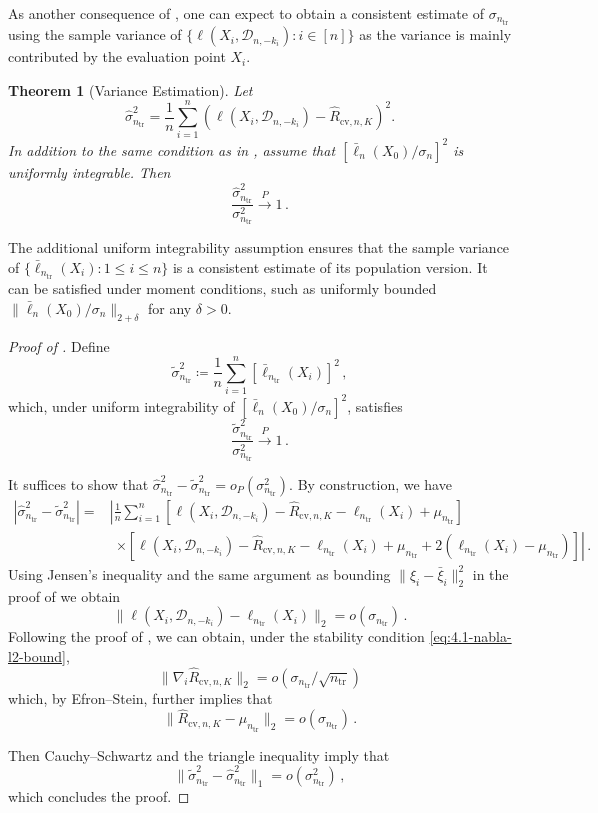 \documentclass[11pt]{article}
\theoremstyle{plain}
\newtheorem{theorem}{Theorem}[section]
\newcommand{\cv}{{\mathrm{cv}}}
\newcommand{\tr}{{\mathrm{tr}}}
\newcommand{\D}{{\mathcal{D}}}
\begin{document}
As another consequence of , one can expect to obtain a consistent estimate of $\sigma_{n_\tr}$ using the sample variance of $\{\ell(X_i,\D_{n,-k_i}):i\in[n]\}$ as the variance is mainly contributed by the evaluation point $X_i$.
\begin{theorem}[Variance Estimation]\label{thm:4.1-var-est}
    Let 
    $$\hat\sigma_{n_\tr}^2=\frac{1}{n}\sum_{i=1}^n\left(\ell(X_i,\D_{n,-k_i})-\hat R_{\cv,n,K}\right)^2.$$
In addition to the same condition as in , assume that
 $[\bar\ell_n(X_0)/\sigma_n]^2$ is uniformly integrable.
Then 
    $$
    \frac{\hat\sigma_{n_\tr}^2}{\sigma_{n_\tr}^2}\stackrel{P}{\rightarrow} 1\,.
    $$
\end{theorem}
The additional uniform integrability assumption ensures that the sample variance of $\{\bar\ell_{n_\tr}(X_i):1\le i\le n\}$ is a consistent estimate of its population version. It can be satisfied under moment conditions, such as uniformly bounded $\|\bar\ell_n(X_0)/\sigma_n\|_{2+\delta}$ for any $\delta>0$.
\begin{proof}
    [Proof of ]
    
    Define 
    $$\tilde\sigma_{n_\tr}^2\coloneqq \frac{1}{n}\sum_{i=1}^n [\bar\ell_{n_\tr}(X_i)]^2\,,$$
    which, under uniform integrability of $[\bar\ell_n(X_0)/\sigma_n]^2$, satisfies
    $$
    \frac{\tilde\sigma_{n_\tr}^2}{\sigma_{n_\tr}^2}\stackrel{P}{\rightarrow} 1\,.
    $$

    It suffices to show that $\hat\sigma_{n_\tr}^2-\tilde\sigma_{n_\tr}^2=o_P(\sigma_{n_\tr}^2)$.
    By construction, we have
    \begin{align*}
       | \hat \sigma_{n_\tr}^2-\tilde\sigma_{n_\tr}^2| = & \left|\frac{1}{n}\sum_{i=1}^n \left[\ell(X_i,\D_{n,-k_i}) - \hat R_{\cv,n,K}-\ell_{n_\tr}(X_i)+\mu_{n_\tr}\right]\right.\\
       &~~\left.\times \left[\ell(X_i,\D_{n,-k_i}) - \hat R_{\cv,n,K}-\ell_{n_\tr}(X_i)+\mu_{n_\tr}+2(\ell_{n_\tr}(X_i)-\mu_{n_\tr})\right]\right|\,.
    \end{align*}
    Using Jensen's inequality and the same argument as bounding $\|\xi_i-\bar\xi_i\|_2^2$ in the proof of  we obtain
    $$ \|\ell(X_i,\D_{n,-k_i})-\ell_{n_\tr}(X_i)\|_2= o(\sigma_{n_\tr})\,.
    $$
Following the proof of , we can obtain, under the stability condition \eqref{eq:4.1-nabla-l2-bound},
$$\|\nabla_i \hat R_{\cv,n,K}\|_2=o(\sigma_{n_\tr}/\sqrt{n_\tr})$$
which, by Efron--Stein, further implies that
$$\|\hat R_{\cv,n,K}-\mu_{n_\tr}\|_2=o(\sigma_{n_\tr})\,.$$

Then Cauchy–Schwartz and the triangle inequality imply that
$$
\|\tilde\sigma_{n_\tr}^2-\hat\sigma_{n_\tr}^2\|_1=o(\sigma_{n_\tr}^2)\,,
$$
which concludes the proof.
\end{proof}
\end{document}
